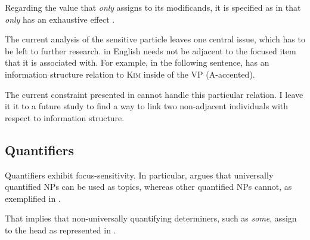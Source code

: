 \noindent Regarding the  value that \textit{only}
assigns to its modificands, it is specified as  in
that \textit{only} has an exhaustive effect \citep{velleman:etal:12}.


The current analysis of the  sensitive particle  leaves
one central issue, which has to be left to further
research.  in English needs not be adjacent to the focused
item that it is associated with. For example, in the following
sentence,  has an information structure relation to
\textsc{Kim} inside of the VP (A-accented).




\noindent The current constraint presented in  cannot
handle this particular relation.  I leave it it to a future study to
find a way to link two non-adjacent individuals with respect to
information structure.


\subsection{Quantifiers}
\label{10:sssec:quantifiers}



Quantifiers  exhibit focus-sensitivity. In
particular, \citet{lambrecht:96} argues that universally quantified
NPs can be used as topics, whereas other quantified NPs cannot, as
exemplified in .




\noindent That implies that non-universally quantifying determiners,
such as \textit{some}, assign  to the head as
represented in .




